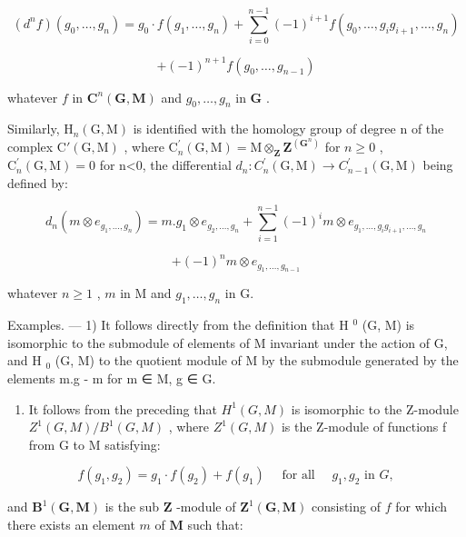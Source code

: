 \[
(d ^ {n} f) (g _ {0}, \dots , g _ {n}) = g _ {0} \cdot f (g _ {1}, \dots , g _ {n}) + \sum_ {i = 0} ^ {n - 1} (- 1) ^ {i + 1} f (g _ {0}, \dots , g _ {i} g _ {i + 1}, \dots , g _ {n})
\]

\[
+ (- 1) ^ {n + 1} f \left(g _ {0}, \dots , g _ {n - 1}\right)
\]

whatever \(f\) in \(\mathbf{C}^{n}(\mathbf{G},\mathbf{M})\) and \(g_{0},\ldots,g_{n}\) in \(\mathbf{G}\) .

Similarly, \(\mathrm{H}_{n}(\mathrm{G},\mathrm{M})\) is identified with the homology group of degree n of the complex \(\mathrm{C}'(\mathrm{G},\mathrm{M})\) , where \(\mathrm{C}_{n}^{\prime}(\mathrm{G},\mathrm{M})=\mathrm{M}\otimes_{\mathbf{Z}}\mathbf{Z}^{(\mathbf{G}^{n})}\) for \(n\geqslant0\) , \(\mathrm{C}_{n}^{\prime}(\mathrm{G},\mathrm{M})=0\) for n\textless0, the differential \(d_{n}:C_{n}^{\prime}(\mathrm{G},\mathrm{M})\to C_{n-1}^{\prime}(\mathrm{G},\mathrm{M})\) being defined by:

\[
d _ {n} (m \otimes e _ {g _ {1}, \dots , g _ {n}}) = m. g _ {1} \otimes e _ {g _ {2}, \dots , g _ {n}} + \sum_ {i = 1} ^ {n - 1} (- 1) ^ {i} m \otimes e _ {g _ {1}, \dots , g _ {i} g _ {i + 1}, \dots , g _ {n}}
\]

\[
+ (- 1) ^ {n} m \otimes e _ {g _ {1}, \dots , g _ {n - 1}}
\]

whatever \(n \geqslant 1\) , \(m\) in M and \(g_1, \ldots, g_n\) in G.

Examples. --- 1) It follows directly from the definition that H \(^{0}\) (G, M) is isomorphic to the submodule of elements of M invariant under the action of G, and H \(_{0}\) (G, M) to the quotient module of M by the submodule generated by the elements m.g - m for m ∈ M, g ∈ G.

\begin{enumerate}
\def\labelenumi{\arabic{enumi})}
\setcounter{enumi}{1}
\tightlist
\item
  It follows from the preceding that \(H^{1}(G, M)\) is isomorphic to the Z-module \(Z^{1}(G, M)/B^{1}(G, M)\) , where \(Z^{1}(G, M)\) is the Z-module of functions f from G to M satisfying:
\end{enumerate}

\[
f \left(g _ {1}, g _ {2}\right) = g _ {1} \cdot f \left(g _ {2}\right) + f \left(g _ {1}\right) \quad \text { for   all } \quad g _ {1}, g _ {2} \text { in } G,
\]

and \(\mathbf{B}^{1}(\mathbf{G},\mathbf{M})\) is the sub \(\mathbf{Z}\) -module of \(\mathbf{Z}^{1}(\mathbf{G},\mathbf{M})\) consisting of \(f\) for which there exists an element \(m\) of \(\mathbf{M}\) such that:

